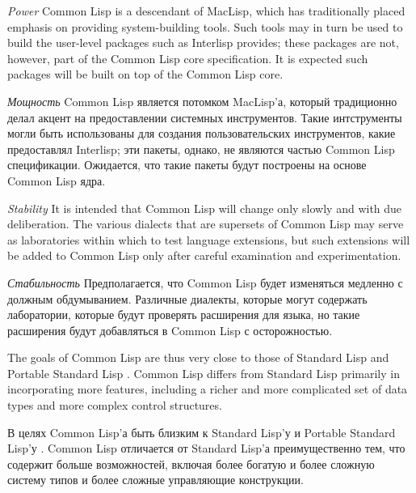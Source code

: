 \begin{flushdesc}
\item[{\it Power}]
Common Lisp is a descendant of MacLisp, which has
traditionally placed emphasis on providing system-building tools.
Such tools may in turn be used to build the user-level packages
such as Interlisp provides; these packages are not, however, part
of the Common Lisp core specification.  It is expected such packages will
be built on top of the Common Lisp core.

\item[{\it Мощность}]
Common Lisp является потомком MacLisp'а, который традиционно делал
акцент на предоставлении системных инструментов. Такие интструменты
могли быть использованы для создания пользовательских
инструментов, какие предоставлял Interlisp; эти пакеты, однако, не
являются частью Common Lisp спецификации. Ожидается, что
такие пакеты будут построены на основе Common Lisp ядра.

\item[{\it Stability}]
It is intended that Common Lisp
will change only slowly and with due deliberation.  The various dialects
that are supersets of Common Lisp may serve as laboratories within which to
test language extensions, but such extensions will be added to
Common Lisp only after careful examination and experimentation.

\item[{\it Стабильность}]
Предполагается, что Common Lisp будет изменяться медленно с
должным обдумыванием. Различные диалекты, которые могут содержать
лаборатории, которые будут проверять расширения для языка, но
такие расширения будут добавляться в Common Lisp с осторожностью.
\end{flushdesc}


The goals of Common Lisp are thus very close to those of Standard Lisp
\cite{STANDARD-LISP-REPORT} and Portable Standard Lisp \cite{PSL-MANUAL}.
Common Lisp differs from Standard Lisp
primarily in incorporating more features, including a
richer and more complicated set of data types and more complex
control structures.

В целях Common Lisp'а быть близким к Standard Lisp'у \cite{STANDARD-LISP-REPORT}
и Portable Standard Lisp'у \cite{PSL-MANUAL}. Common Lisp отличается от Standard
Lisp'а преимущественно тем, что содержит больше возможностей, включая более
богатую и более сложную систему типов и более сложные управляющие конструкции. 

